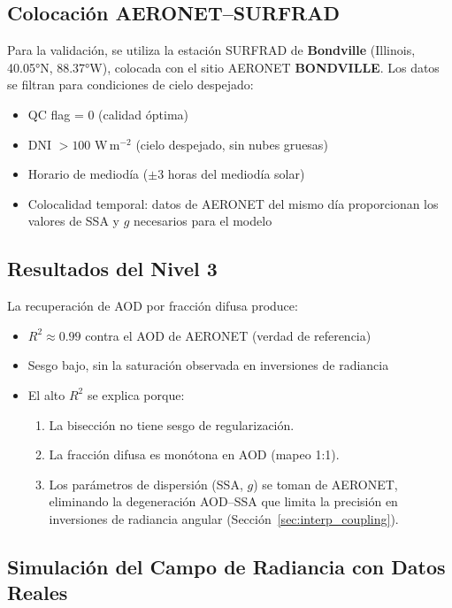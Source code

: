 \documentclass[a4paper,11pt]{article}
\begin{document}
\subsection{Colocaci\'on AERONET--SURFRAD}

Para la validaci\'on, se utiliza la estaci\'on SURFRAD de \textbf{Bondville}
(Illinois, 40.05°N, 88.37°W), colocada con el sitio AERONET
\textbf{BONDVILLE}.  Los datos se filtran para condiciones de cielo despejado:
\begin{itemize}
    \item QC flag = 0 (calidad \'optima)
    \item DNI $> 100$ W\,m$^{-2}$ (cielo despejado, sin nubes gruesas)
    \item Horario de mediod\'ia ($\pm 3$ horas del mediod\'ia solar)
    \item Colocalidad temporal: datos de AERONET del mismo d\'ia proporcionan
          los valores de SSA y $g$ necesarios para el modelo
\end{itemize}

\subsection{Resultados del Nivel 3}

La recuperaci\'on de AOD por fracci\'on difusa produce:
\begin{itemize}
    \item $R^2 \approx 0.99$ contra el AOD de AERONET (verdad de referencia)
    \item Sesgo bajo, sin la saturaci\'on observada en inversiones de radiancia
    \item El alto $R^2$ se explica porque:
    \begin{enumerate}
        \item La bisecci\'on no tiene sesgo de regularizaci\'on.
        \item La fracci\'on difusa es mon\'otona en AOD (mapeo 1:1).
        \item Los par\'ametros de dispersi\'on (SSA, $g$) se toman de AERONET,
              eliminando la degeneraci\'on AOD--SSA que limita la precisi\'on
              en inversiones de radiancia angular (Secci\'on~\ref{sec:interp_coupling}).
    \end{enumerate}
\end{itemize}

\subsection{Simulaci\'on del Campo de Radiancia con Datos Reales}
\end{document}
